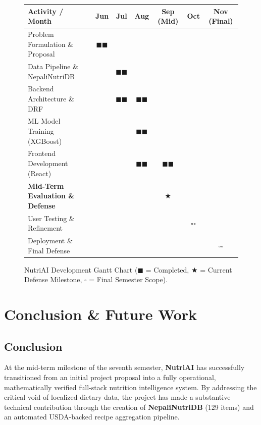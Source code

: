 \documentclass[12pt,a4paper]{report}
\begin{document}
\begin{figure}[htbp]
\centering
\small
\begin{tabular}{p{4.2cm}|c|c|c|c|c|c}
\toprule
\textbf{Activity / Month} & \textbf{Jun} & \textbf{Jul} & \textbf{Aug} & \textbf{Sep (Mid)} & \textbf{Oct} & \textbf{Nov (Final)} \\
\midrule
Problem Formulation \& Proposal & $\blacksquare\blacksquare$ & & & & & \\
Data Pipeline \& NepaliNutriDB & & $\blacksquare\blacksquare$ & & & & \\
Backend Architecture \& DRF & & $\blacksquare\blacksquare$ & $\blacksquare\blacksquare$ & & & \\
ML Model Training (XGBoost) & & & $\blacksquare\blacksquare$ & & & \\
Frontend Development (React) & & & $\blacksquare\blacksquare$ & $\blacksquare\blacksquare$ & & \\
\textbf{Mid-Term Evaluation \& Defense} & & & & $\bigstar$ & & \\
User Testing \& Refinement & & & & & $\square\square$ & \\
Deployment \& Final Defense & & & & & & $\square\square$ \\
\bottomrule
\end{tabular}
\caption{NutriAI Development Gantt Chart ($\blacksquare$ = Completed, $\bigstar$ = Current Defense Milestone, $\square$ = Final Semester Scope).}
\label{fig:gantt}
\end{figure}

\chapter{Conclusion \& Future Work}

\section{Conclusion}

At the mid-term milestone of the seventh semester, \textbf{NutriAI} has successfully transitioned from an initial project proposal into a fully operational, mathematically verified full-stack nutrition intelligence system. By addressing the critical void of localized dietary data, the project has made a substantive technical contribution through the creation of \textbf{NepaliNutriDB} (129 items) and an automated USDA-backed recipe aggregation pipeline.
\end{document}
